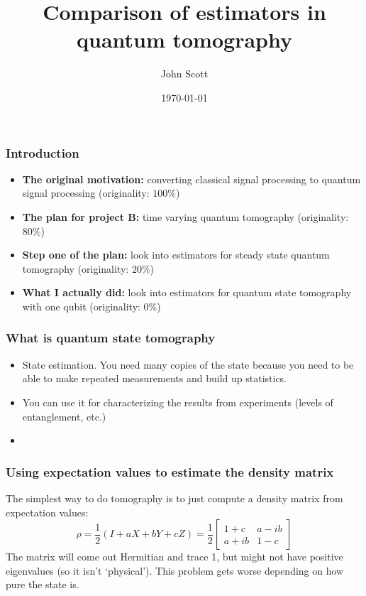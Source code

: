 \documentclass{beamer}
\title{Comparison of estimators in quantum tomography}
\author{John Scott}
\date{\today}
\begin{document}
\begin{frame}
  \titlepage
\end{frame}


\begin{frame}
  \frametitle{Introduction}
  \begin{itemize}
  \item \textbf{The original motivation:} converting classical signal processing to quantum signal processing (originality: $100\%$)
  \item \textbf{The plan for project B:} time varying quantum tomography (originality: $80\%$)
  \item \textbf{Step one of the plan:} look into estimators for steady state quantum tomography (originality: $20\%$)
  \item \textbf{What I actually did:} look into estimators for quantum state tomography with one qubit (originality: $0\%$)
  \end{itemize}
\end{frame}

\begin{frame}
  \frametitle{What is quantum state tomography}
  \begin{itemize}
  \item State estimation. You need many copies of the state because you need to be able to make repeated measurements and build up statistics.
  \item You can use it for characterizing the results from experiments (levels of entanglement, etc.)
  \item 
  \end{itemize}
\end{frame}

\begin{frame}
  \frametitle{Using expectation values to estimate the density matrix}
  The simplest way to do tomography is to just compute a density matrix from expectation values:
  \begin{equation}
    \rho = \frac{1}{2} (I + aX + bY + cZ) = \frac{1}{2}\begin{bmatrix} 1 + c & a - ib \\ a + ib & 1 -c\end{bmatrix}    
  \end{equation}
  The matrix will come out Hermitian and trace 1, but might not have positive eigenvalues (so it isn't `physical'). This problem gets worse depending on how pure the state is. 
\end{frame}
\end{document}
